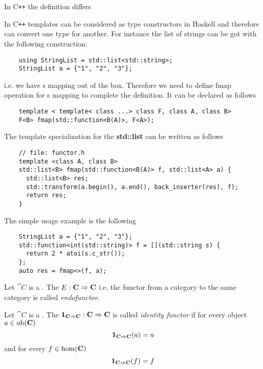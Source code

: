 In C\texttt{++} the definition differs
\begin{example}
  \label{ex:functor_cpp}
  In C\texttt{++} templates can be considered as type constructors in Haskell
  and therefore can convert one type for another. For instance the
  list of strings can be got with the following construction:

  \begin{verbatim}
    using StringList = std::list<std::string>;
    StringList a = {"1", "2", "3"};
  \end{verbatim} 
  i.e. we have s mapping out of the box.
  Therefore we need to define fmap
  operation for s mapping to complete the
   definition. It can be declared as 
  follows 
  \begin{verbatim}
    template < template< class ...> class F, class A, class B> 
    F<B> fmap(std::function<B(A)>, F<A>);
  \end{verbatim}
  The template specialization for the \textbf{std::list} can be
  written as follows
  \begin{verbatim}
    // file: functor.h
    template <class A, class B>
    std::list<B> fmap(std::function<B(A)> f, std::list<A> a) {
      std::list<B> res;
      std::transform(a.begin(), a.end(), back_inserter(res), f);
      return res;
    }
  \end{verbatim} 

  The simple usage example is the following
  \begin{verbatim}
    StringList a = {"1", "2", "3"};
    std::function<int(std::string)> f = [](std::string s) {
      return 2 * atoi(s.c_str());
    };
    auto res = fmap<>(f, a);
  \end{verbatim}
\end{example}


\begin{definition}[Endofunctor]
  \label{def:endofunctor}
  Let $\cat{C}$ is a . The
   $E: \mathbf{C} \Rightarrow \mathbf{C}$ i.e. 
  the functor from a category to the same category is called
  \textit{endofunctor}. 
\end{definition}

\begin{definition}
  \label{def:idfunctor}
  Let $\cat{C}$ is a . The
   $\mathbf{1}_{ \mathbf{C} \Rightarrow \mathbf{C} }: \mathbf{C} \Rightarrow \mathbf{C}$ is called \textit{identity
    functor} if for every object $a \in \mathrm{ob}(\mathbf{C})$
  \[
  \mathbf{1}_{ \mathbf{C} \Rightarrow \mathbf{C} }(a) = a
  \]
  and for every  $f \in \mathrm{hom}(\mathbf{C})$
  \[
  \mathbf{1}_{ \mathbf{C} \Rightarrow \mathbf{C} }(f) = f
  \] 
\end{definition}

